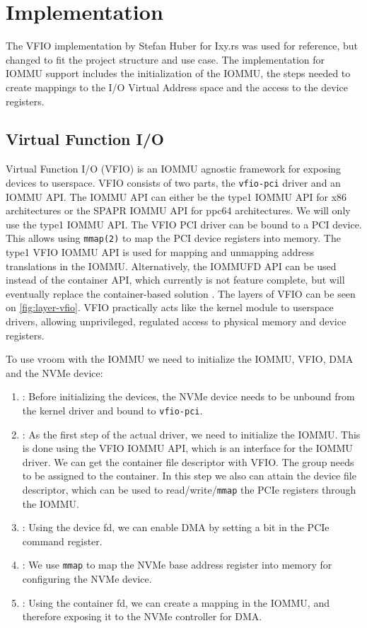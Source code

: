 \chapter{Implementation} \label{c:impl}

The VFIO implementation by Stefan Huber for Ixy.rs was used for reference, but changed to fit the project structure and use case. The implementation for IOMMU support includes the initialization of the IOMMU, the steps needed to create mappings to the I/O Virtual Address space and the access to the device registers.

\section{Virtual Function I/O}
Virtual Function I/O (VFIO) is an IOMMU agnostic framework for exposing devices to userspace. VFIO consists of two parts, the \texttt{vfio-pci} driver and an IOMMU API. The IOMMU API can either be the type1 IOMMU API for x86 architectures or the SPAPR IOMMU API for ppc64 architectures. We will only use the type1 IOMMU API. The VFIO PCI driver can be bound to a PCI device. This allows using \texttt{mmap(2)} to map the PCI device registers into memory. The type1 VFIO IOMMU API is used for mapping and unmapping address translations in the IOMMU. Alternatively, the IOMMUFD API can be used instead of the container API, which currently is not feature complete, but will eventually replace the container-based solution \cite{vfiokerneldocs}. The layers of VFIO can be seen on \autoref{fig:layer-vfio}. VFIO practically acts like the kernel module to userspace drivers, allowing unprivileged, regulated access to physical memory and device registers.

To use vroom with the IOMMU we need to initialize the IOMMU, VFIO, DMA and the NVMe device:
\begin{enumerate}
    \item \textbf{}: Before initializing the devices, the NVMe device needs to be unbound from the kernel driver and bound to \texttt{vfio-pci}.
    \item \textbf{}: As the first step of the actual driver, we need to initialize the IOMMU. This is done using the VFIO IOMMU API, which is an interface for the IOMMU driver. We can get the container file descriptor with VFIO. The group needs to be assigned to the container. In this step we also can attain the device file descriptor, which can be used to read/write/\texttt{mmap} the PCIe registers through the IOMMU.
    \item \textbf{}: Using the device fd, we can enable DMA by setting a bit in the PCIe command register.
    \item \textbf{}: We use \texttt{mmap} to map the NVMe base address register into memory for configuring the NVMe device.
    \item \textbf{}: Using the container fd, we can create a mapping in the IOMMU, and therefore exposing it to the NVMe controller for DMA.
\end{enumerate}

